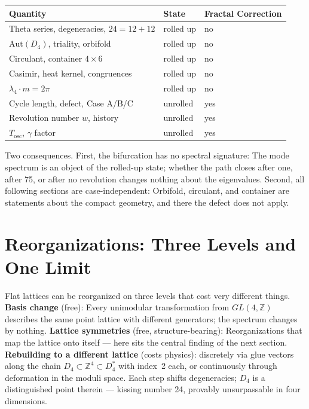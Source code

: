 \begin{center}
\small
\begin{tabular}{p{4.2cm}ll}
\toprule
Quantity & State & Fractal Correction \\
\midrule
Theta series, degeneracies, $24 = 12+12$ & rolled up & no \\
$\mathrm{Aut}(D_4)$, triality, orbifold & rolled up & no \\
Circulant, container $4\times6$ & rolled up & no \\
Casimir, heat kernel, congruences & rolled up & no \\
$\lambda_4\cdot m = 2\pi$ & rolled up & no \\
\midrule
Cycle length, defect, Case A/B/C & unrolled & yes \\
Revolution number $w$, history & unrolled & yes \\
$T_{\mathrm{osc}}$, $\gamma$ factor & unrolled & yes \\
\bottomrule
\end{tabular}
\end{center}

Two consequences. First, the bifurcation has no spectral signature:
The mode spectrum is an object of the rolled-up state; whether the path
closes after one, after 75, or after no revolution changes nothing about the
eigenvalues. Second, all following sections are
case-independent: Orbifold, circulant, and container are statements about the
compact geometry, and there the defect does not apply.

\section{Reorganizations: Three Levels and One Limit}

Flat lattices can be reorganized on three levels that cost very
different things. \textbf{Basis change} (free): Every
unimodular transformation from $GL(4,\mathbb{Z})$ describes the same
point lattice with different generators; the spectrum changes by nothing.
\textbf{Lattice symmetries} (free, structure-bearing): Reorganizations
that map the lattice onto itself --- here sits the central finding of the
next section. \textbf{Rebuilding to a different lattice} (costs
physics): discretely via glue vectors along the chain
$D_4\subset\mathbb{Z}^4\subset D_4^*$ with index~2 each, or
continuously through deformation in the moduli space. Each step shifts
degeneracies; $D_4$ is a distinguished point therein --- kissing number 24,
provably unsurpassable in four dimensions.

